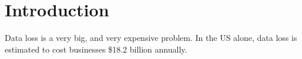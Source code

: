 \section{Introduction}

Data loss is a very big, and very expensive problem. In the US alone, data loss
is estimated to cost businesses \$18.2 billion annually\cite{smith03}.
